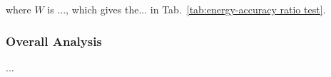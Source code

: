 where $W$ is ..., which gives the... in Tab.~\ref{tab:energy-accuracy ratio test}.

\begin{table}[htb]
\centering
\caption{The results of the energy-precision ratio test}
\label{tab:energy-accuracy ratio test}
\end{table}

\subsubsection{Overall Analysis}
...